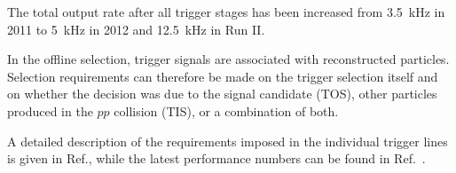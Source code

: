 The total output rate after all trigger stages has been increased from
\SI{3.5}{\kilo\hertz} in 2011 to \SI{5}{\kilo\hertz} in 2012 and
\SI{12.5}{\kilo\hertz} in Run II.

In the offline selection, trigger signals are associated with reconstructed
particles. Selection requirements can therefore be made on the trigger
selection itself and on whether the decision was due to the signal candidate
(TOS), other particles produced in the $pp$ collision (TIS), or a combination
of both.

A detailed description of the requirements imposed in the individual trigger
lines is given in Ref.\cite{LHCb-DP-2012-004}, while the latest performance
numbers can be found in Ref.~\cite{TriggerPerformance2012}.
